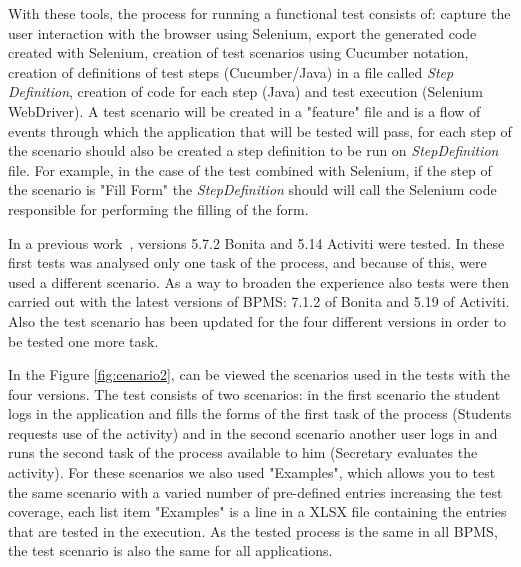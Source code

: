 \documentclass[runningheads,a4paper]{llncs}
\begin{document}
With these tools, the process for running a functional test consists of: capture the user interaction with the browser using Selenium, export the generated code created with Selenium, creation of test scenarios using Cucumber notation, creation of definitions of test steps (Cucumber/Java) in a file called \emph{Step Definition}, creation of code for each step (Java) and test execution (Selenium WebDriver). A test scenario will be created in a "feature" file and is a flow of events through which the application that will be tested will pass, for each step of the scenario should also be created a step definition to be run on \emph{StepDefinition} file. For example, in the case of the test combined with Selenium, if the step of the scenario is "Fill Form" the \emph{StepDefinition} should will call the Selenium code responsible for performing the filling of the form.

In a previous work~\cite{sbqs2015}, versions 5.7.2 Bonita and 5.14 Activiti were tested. In these first tests was analysed only one task of the process, and because of this, were used a different scenario. As a way to broaden the experience also tests were then carried out with the latest versions of BPMS: 7.1.2 of Bonita and 5.19 of Activiti. Also the test scenario has been updated for the four different versions in order to be tested one more task. 

In the Figure \ref{fig:cenario2}, can be viewed the scenarios used in the tests with the four versions. The test consists of two scenarios: in the first scenario the student logs in the application and fills the forms of the first task of the process (Students requests use of the activity) and in the second scenario another user logs in and runs the second task of the process available to him (Secretary evaluates the activity). For these scenarios we also used "Examples", which allows you to test the same scenario with a varied number of pre-defined entries increasing the test coverage, each list item "Examples" is a line in a XLSX file containing the entries that are tested in the execution. As the tested process is the same in all BPMS, the test scenario is also the same for all applications.
\end{document}

